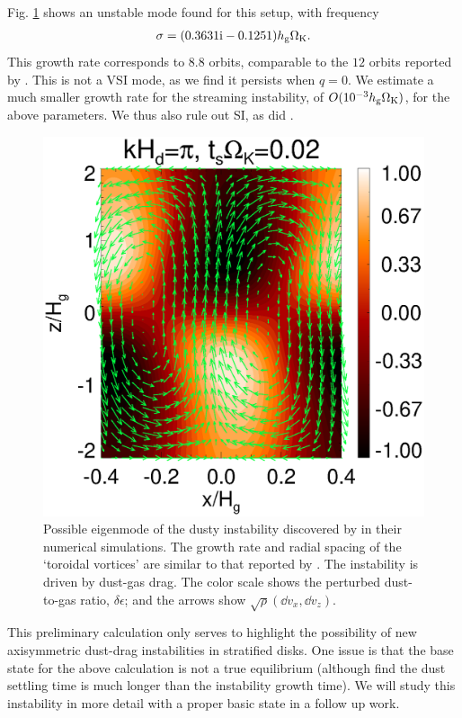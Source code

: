 Fig. \ref{result2d_loren} shows an unstable mode found for this setup,
with  
frequency 
\begin{align*}
\sigma = (0.3631\mathrm{i} - 0.1251)h_\mathrm{g}\Omega_{\rm K}. 
\end{align*}
This growth rate corresponds to $8.8$ orbits, comparable to the $12$
orbits reported by \citeauthor{loren15}. This is not a VSI mode, as we
find it persists when $q=0$. We estimate a much smaller growth
rate for the streaming instability, of 
$O(10^{-3}h_\mathrm{g}\Omega_{\rm K})$, for the above parameters. We thus also rule out
SI, as did \citeauthor{loren15}. 


\begin{figure}
  \includegraphics[width=\linewidth]{figures/result2d_loren.ps}
  \caption{Possible eigenmode of the dusty instability discovered by 
    \cite{loren15} in their numerical simulations. The growth rate and 
    radial spacing of the `toroidal vortices' are similar to that
    reported by \citeauthor{loren15}. The instability is driven by
    dust-gas drag. The color scale shows the
    perturbed  
    dust-to-gas ratio, $\delta\epsilon$; and the arrows show
    $\sqrt{\rho}\left(\dd v_x, \dd v_z\right)$.
    \label{result2d_loren}
  }
\end{figure}

This preliminary calculation only serves to highlight the possibility
of new axisymmetric dust-drag instabilities in stratified disks. One 
issue is that the base state for the above calculation is not a true
equilibrium (although \citeauthor {loren15} find the dust settling
time is much longer than the instability growth time). We will study
this instability in more detail with a proper basic
state in a follow up work.  

